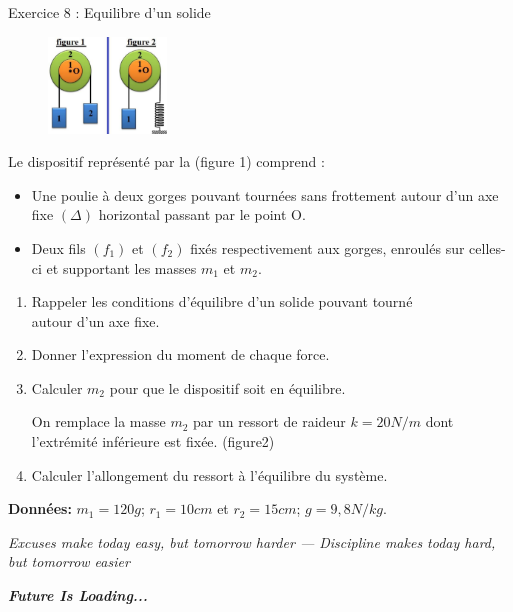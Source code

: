\documentclass[12pt, french]{article}
\begin{document}
\begin{Box2}{Exercice 8 : Equilibre d’un solide  }
	\begin{figure}
  \begin{center}
	\includegraphics[width=0.28\textwidth]{./img/ex07.png}
  \end{center}
\end{figure}

Le dispositif représenté par la (figure 1) comprend :

\begin{itemize}
	\item  Une poulie à deux gorges pouvant tournées
sans frottement autour d'un axe fixe $(\Delta)$
horizontal passant par le point O.
\item Deux fils $(f_1)$ et $(f_2)$ fixés respectivement aux
gorges, enroulés sur celles-ci et supportant les
masses $m_1$ et $m_2$.
\end{itemize}

\begin{enumerate}

	\item Rappeler les conditions d'équilibre d'un solide
pouvant tourné \\ autour d'un axe fixe.

\item  Donner l'expression du moment de chaque force.

\item Calculer $m_2$ pour que le dispositif soit en
équilibre.

On remplace la masse $m_2$ par un ressort de raideur $k = 20N/m$ dont l'extrémité inférieure est fixée.
(figure2)

\item  Calculer l'allongement du ressort à l'équilibre du système.
\end{enumerate}

\textbf{Données:} $m_1 = 120g$; $r_1 = 10cm$ et $r_2 = 15cm$; $g = 9,8 N/kg$.

\end{Box2}





\begin{center}
	\emph{Excuses make today easy, but tomorrow harder --- Discipline makes today hard, but tomorrow easier }


	\emph{\textbf{Future Is Loading...}}

\end{center}
\end{document}
